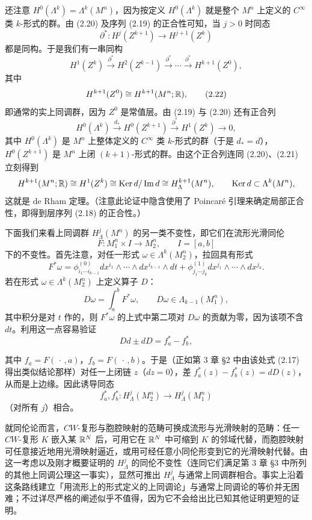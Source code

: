 还注意 $H^0(\Lambda^k)=\Lambda^k(M^n)$，因为按定义 $H^0(\Lambda^k)$ 就是整个 $M^n$ 上定义的 $C^\infty$ 类 $k$-形式的群。由 (2.20) 及序列 (2.19) 的正合性可知，当 $j>0$ 时同态
\[
  \partial^*:H^j(Z^{k+1})\longrightarrow H^{j+1}(Z^k)
\]
都是同构。于是我们有一串同构
\begin{equation}
  H^1(Z^k)\stackrel{\partial^*}{\longrightarrow}H^2(Z^{k-1})\stackrel{\partial^*}{\longrightarrow}
  \cdots\stackrel{\partial^*}{\longrightarrow}H^{k+1}(Z^0), \tag{2.21}
\end{equation}
其中
\begin{equation}
  H^{k+1}(Z^0)\cong H^{k+1}(M^n;\mathbb{R}), \tag{2.22}
\end{equation}
即通常的实上同调群，因为 $Z^0$ 是常值层。由 (2.19) 与 (2.20) 还有正合列
\[
  H^0(\Lambda^k)\stackrel{d_*}{\longrightarrow}H^0(Z^{k+1})
  \stackrel{\partial^*}{\longrightarrow}H^1(Z^k)\longrightarrow0,
\]
其中 $H^0(\Lambda^k)$ 是 $M^n$ 上整体定义的 $C^\infty$ 类 $k$-形式的群（于是 $d_*=d$），$H^0(Z^{k+1})$ 是 $M^n$ 上闭 $(k+1)$-形式的群。由这个正合列连同 (2.20)、(2.21) 立刻得到
\[
  H^{k+1}(M^n;\mathbb{R})\cong H^1(Z^k)\cong\operatorname{Ker} d/\operatorname{Im} d\cong H^{k+1}_\Lambda(M^n),
  \qquad \operatorname{Ker} d\subset\Lambda^k(M^n),
\]
这就是 de Rham 定理。（注意此论证中隐含使用了 Poincaré 引理来确定局部正合性，即得到层序列 (2.18) 的正合性。）

下面我们来看上同调群 $H^j_\Lambda(M^n)$ 的另一类不变性，即它们在流形光滑同伦
\[
  F:M^n_1\times I\longrightarrow M^n_2,\qquad I=[a,b]
\]
下的不变性。首先注意，对任一形式 $\omega\in\Lambda^k(M^n_2)$，拉回具有形式
\[
  F^*\omega=\phi^{(0)}_{i_1\cdots i_{k-1}}dx^{i_1}\wedge\cdots\wedge dx^{i_{k-1}}\wedge dt
  +\phi^{(1)}_{j_1\cdots j_k}dx^{j_1}\wedge\cdots\wedge dx^{j_k}.
\]
若在形式 $\omega\in\Lambda^k(M^n_2)$ 上定义算子 $D$：
\[
  D\omega=\int_a^bF^*\omega,\qquad D\omega\in\Lambda_{k-1}(M^n_1),
\]
其中积分是对 $t$ 作的，则 $F^*\omega$ 的上式中第二项对 $D\omega$ 的贡献为零，因为该项不含 $dt$。利用这一点容易验证
\[
  Dd\pm dD=f_a^*-f_b^*,
\]

其中 $f_a=F(\,\cdot\,,a)$，$f_b=F(\,\cdot\,,b)$。于是（正如第 3 章 §2 中由该处式 (2.17) 得出类似结论那样）对任一上闭链 $z$（$dz=0$），差 $f_a^*(z)-f_b^*(z)=dD(z)$，从而是上边缘。因此诱导同态
\[
  f_a^*,f_b^*:H^j_\Lambda(M^n_2)\longrightarrow H^j_\Lambda(M^n_1)
\]
（对所有 $j$）相合。

就同伦论而言，$CW$-复形与胞腔映射的范畴可换成流形与光滑映射的范畴：任一 $CW$-复形 $K$ 嵌入某 $\mathbb{R}^N$ 后，可用它在 $\mathbb{R}^N$ 中可缩到 $K$ 的邻域代替，而胞腔映射可任意接近地用光滑映射逼近，或用可经任意小同伦形变到它的光滑映射代替。由这一考虑以及刚才概要证明的 $H^j_\Lambda$ 的同伦不变性（连同它们满足第 3 章 §3 中所列的其他上同调公理这一事实），显然可推出 $H^j_\Lambda$ 与通常上同调群相合。事实上沿着这条路线建立「用流形上的形式定义的上同调论」与通常上同调论的等价并无困难；不过详尽严格的阐述似乎不值得，因为它不会给出比已知其他证明更短的证明。

